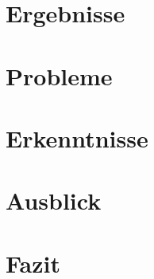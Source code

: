 
\section{Ergebnisse}

\section{Probleme} %

\section{Erkenntnisse}

\section{Ausblick} %

\section{Fazit}
